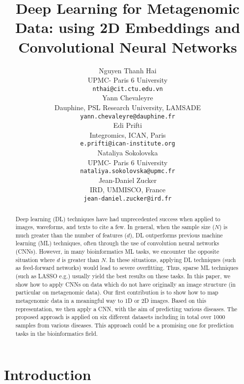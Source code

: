 \documentclass{article}
\title{Deep Learning for Metagenomic Data: using 2D Embeddings and Convolutional Neural Networks}
\author{
Nguyen Thanh Hai\\
UPMC- Paris 6 University\\ 
\texttt{nthai@cit.ctu.edu.vn} \\
\And
   Yann Chevaleyre\\
    Dauphine, PSL Research University, LAMSADE\\
   \texttt{yann.chevaleyre@dauphine.fr} \\
     \And
   Edi Prifti \\  
   Integromics, ICAN, Paris \\
   \texttt{e.prifti@ican-institute.org} \\
   \And
   Nataliya Sokolovska\\
   UPMC- Paris 6 University\\ 
   \texttt{nataliya.sokolovska@upmc.fr} \\
   \And
   Jean-Daniel Zucker \\  
   IRD, UMMISCO, France\\
   \texttt{jean-daniel.zucker@ird.fr} \\
}
\begin{document}

\maketitle

\begin{abstract}
Deep learning (DL) techniques have had unprecedented success when applied to images, waveforms, and texts to cite a few. In general, when the sample size ($N$) is much greater than the number of features ($d$), DL  outperforms previous machine learning (ML) techniques, often through the use of convolution neural networks (CNNs). However, in many bioinformatics ML tasks, we encounter the opposite situation where $d$ is greater than $N$. In these situations, applying DL techniques (such as feed-forward networks) would lead to severe overfitting. Thus, sparse ML techniques (such as LASSO e.g.) usually yield the best results on these tasks. In this paper, we show how to apply CNNs on data which do not have originally an image structure (in particular on metagenomic data). Our first contribution is to show how to map metagenomic data in a meaningful way to 1D or 2D images. Based on this representation, we then apply a CNN, with the aim of predicting various diseases. The proposed approach is applied on six different datasets including in total over 1000 samples from various diseases. This approach could be a promising one for prediction tasks in the bioinformatics field.\end{abstract}

\section{Introduction}
\end{document}
